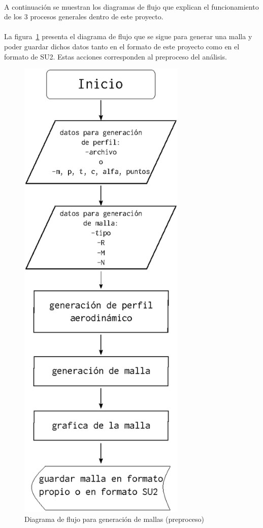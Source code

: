 \documentclass[letterpaper, openright, 12pt]{book}
\begin{document}
    \paragraph*{}
        A continuación se muestran los diagramas de flujo que explican el
        funcionamiento de los 3 procesos generales dentro de este proyecto.

    \paragraph*{}
        La figura~\ref{flujo_malla} presenta el diagrama de flujo que se sigue
        para generar una malla y poder guardar dichos datos tanto en el formato
        de este proyecto como en el formato de SU2. Estas acciones corresponden
        al preproceso del análisis.

    \begin{figure}[htbp!]
        \centering
        \includegraphics[keepaspectratio, width=80mm]{./Imagenes/flujo_malla}
        \caption{Diagrama de flujo para generación de mallas (preproceso)}
        \label{flujo_malla}
    \end{figure}
\end{document}
